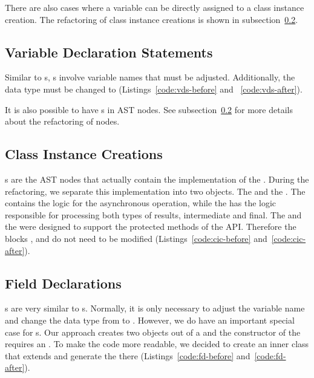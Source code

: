 \documentclass[type=bsc,accentcolor=tud9c]{tudthesis}
\begin{document}


There are also cases where a variable can be directly assigned to a class instance creation. The refactoring of class instance creations is shown in subsection~\ref{sec:imp-class-instance-creations}.

\subsection{Variable Declaration Statements}
\label{sec:imp-variableDeclStatement}
Similar to s, s involve variable names that must be adjusted. Additionally, the data type  must be changed to  (Listings~\ref{code:vds-before} and ~\ref{code:vds-after}).



It is also possible to have s in  AST nodes. See subsection~\ref{sec:imp-class-instance-creations} for more details about the refactoring of  nodes.

\subsection{Class Instance Creations}
\label{sec:imp-class-instance-creations}
s are the AST nodes that actually contain the implementation of the . During the refactoring, we separate this implementation into two objects. The  and the . The  contains the logic for the asynchronous operation, while the  has the logic responsible for processing both types of results, intermediate and final. The  and the  were designed to support the protected methods of the  API. Therefore the blocks ,  and  do not need to be modified (Listings~\ref{code:cic-before} and~\ref{code:cic-after}).



\subsection{Field Declarations}
\label{sec:imp-fieldDeclaration}
s are very similar to s. Normally, it is only necessary to adjust the variable name and change the data type from  to . However, we do have an important special case for s. Our approach creates two objects out of a  and the constructor of the  requires an . To make the code more readable, we decided to create an inner class that extends  and generate the  there (Listings~\ref{code:fd-before} and~\ref{code:fd-after}).
\end{document}
